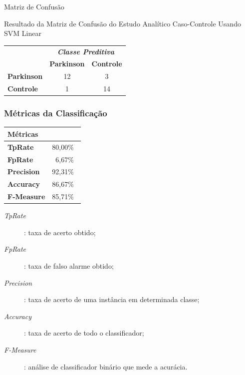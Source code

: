 \documentclass{beamer}
\begin{document}
\begin{frame}{Matriz de Confusão}
	\begin{block}{Resultado da Matriz de Confusão do Estudo Analítico Caso-Controle Usando SVM Linear}
\begin{table}[!htbp]
		\label{table:resultadomatrizconfusaosvm}
		\centering
		\begin{tabular}{l|c|c|}
		\cline{2-3}
		\multicolumn{1}{c}{}                         & \multicolumn{2}{|c|}{\textit{\textbf{Classe Preditiva}}} \\ \cline{2-3} 
																								 & \textbf{Parkinson}      & \textbf{Controle}         \\ \hline
		\multicolumn{1}{|l|}{\textbf{Parkinson}} & 12       & 3           \\ \hline
		\multicolumn{1}{|l|}{\textbf{Controle}}     & 1           & 14     \\ \hline
		\end{tabular}
\end{table}
	\end{block}
\end{frame}

\begin{frame}
   \frametitle{Métricas da Classificação}
   \begin{block}{}
   		\begin{table}[!htbp]
				\label{table:metricasmatrizconfusao}
				\centering
				\begin{tabular}{|l|r|}
				\hline
				\multicolumn{2}{|l|}{\textbf{Métricas}} \\ \hline
				\textbf{TpRate}                    & 80,00$\%$\               \\ \hline
				\textbf{FpRate}                    & 6,67$\%$\                \\ \hline
				\textbf{Precision}                 & 92,31$\%$\                \\ \hline
				\textbf{Accuracy}                  & 86,67$\%$\                \\ \hline
				\textbf{F-Measure}                 & 85,71$\%$\                \\ \hline
				\end{tabular}
				\end{table}
	\end{block}
     \begin{block}{}
				\begin{description}
				\item [\textit{TpRate}]: taxa de acerto obtido;
				\item [\textit{FpRate}]: taxa de falso alarme obtido;
				\item [\textit{Precision}]: taxa de acerto de uma instância em determinada classe;
				\item [\textit{Accuracy}]: taxa de acerto de todo o classificador;
				\item [\textit{F-Measure}]: análise de classificador binário que mede a acurácia.
				\end{description}
    \end{block}
\end{frame}
\end{document}
